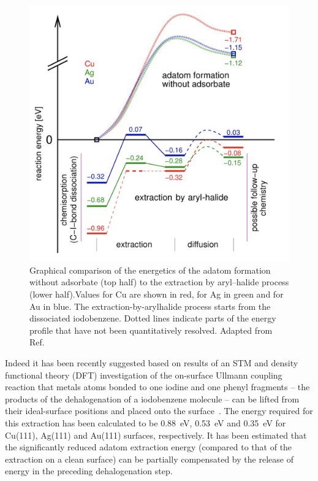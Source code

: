 \documentclass[aps,prb,amsmath,amssymb,11pt]{revtex4-1}
\begin{document}
\begin{figure}[tb]
\centering
\includegraphics[width=0.75\columnwidth]{Fig/Adatom-formation.png}
\caption{Graphical comparison of the energetics of the adatom formation without adsorbate (top half) to the extraction by aryl–halide process (lower half).Values for Cu are shown in red, for Ag in green and for Au in blue. The extraction-by-arylhalide process starts from the dissociated iodobenzene. Dotted lines indicate parts of the energy profile that have not been quantitatively resolved. Adapted from Ref.~\cite{chemeurope2017}}
\label{fig:3}
\end{figure}

\fi

Indeed it has been recently suggested based on results of an STM and density functional theory (DFT) investigation of the on-surface Ullmann coupling reaction that metals atoms bonded to one iodine and one phenyl fragments -- the products of the dehalogenation of a iodobenzene molecule -- can be lifted from their ideal-surface positions and placed onto the surface~\cite{chemeurope2017}. 
%
The energy required for this extraction has been calculated to be \SI{0.88}{\electronvolt}, \SI{0.53}{\electronvolt} and \SI{0.35}{\electronvolt} for Cu(111), Ag(111) and Au(111) surfaces, respectively. %
%
It has been estimated that the significantly reduced adatom extraction energy (compared to that of the extraction on a clean surface) can be partially compensated by the release of energy in the preceding dehalogenation step. %
\end{document}
